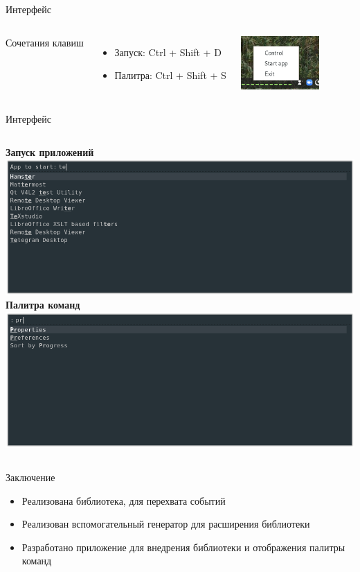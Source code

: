 \documentclass[aspectratio=1610]{beamer}
\begin{document}
\begin{frame}{Интерфейс}
    \begin{columns}
		Сочетания клавиш
		\begin{itemize}
			\item Запуск: Ctrl + Shift + D
			\item Палитра: Ctrl + Shift + S
		\end{itemize}
		\includegraphics[width=3cm]{tray_ui}
	\end{columns} 
\end{frame}

\begin{frame}{Интерфейс}
    \begin{columns}
		\textbf{Запуск приложений}
		\centering
		\includegraphics[width=\textwidth]{start_ui}
		\textbf{Палитра команд}
		\centering
		\includegraphics[width=\textwidth]{control_ui}
	\end{columns}
\end{frame}

\begin{frame}{Заключение}
	\begin{itemize}
		\item Реализована библиотека, для перехвата событий
		\item Реализован вспомогательный генератор для расширения библиотеки
		\item Разработано приложение для внедрения библиотеки и отображения палитры команд
	\end{itemize}
\end{frame}

\frame{\titlepage}
\end{document}
